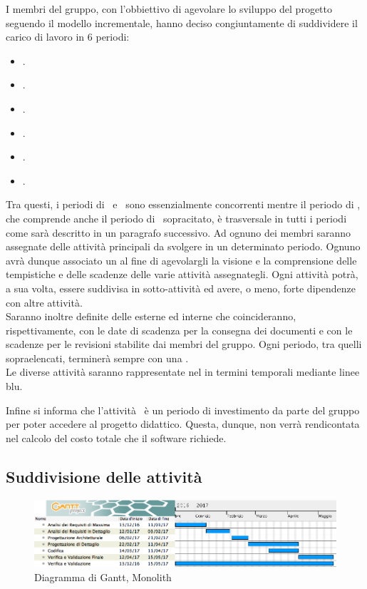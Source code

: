 I membri del gruppo, con l'obbiettivo di agevolare lo sviluppo del progetto seguendo il modello incrementale, hanno deciso congiuntamente di suddividere il carico di lavoro in 6 periodi:
\begin{itemize}
	\item \ARM.
	\item \ARD.
	\item \PA.
	\item \PD.
	\item \COD.
	\item \VV.
\end{itemize}
Tra questi, i periodi di \PD\ e \COD\ sono essenzialmente concorrenti mentre il periodo di , che comprende anche il periodo di \VV\ sopracitato, è trasversale in tutti i periodi come sarà descritto in un paragrafo successivo.
Ad ognuno dei membri saranno assegnate delle attività principali da svolgere in un determinato periodo. Ognuno avrà dunque associato un  al fine di agevolargli la visione e la comprensione delle tempistiche e delle scadenze delle varie attività assegnategli.
Ogni attività potrà, a sua volta, essere suddivisa in sotto-attività ed avere, o meno, forte dipendenze con altre attività.\\
Saranno inoltre definite delle  esterne ed interne che coincideranno, rispettivamente, con le date di scadenza per la consegna dei documenti e con le scadenze per le revisioni stabilite dai membri del gruppo.
Ogni periodo, tra quelli sopraelencati, terminerà sempre con una .\\

Le diverse attività saranno rappresentate nel  in termini temporali mediante linee blu.

Infine si informa che l'attività \ARM\ è un periodo di investimento da parte del gruppo per poter accedere al progetto didattico. Questa, dunque, non verrà rendicontata nel calcolo del costo totale che il software richiede.

\subsection{Suddivisione delle attività}

 \begin{figure}[H]
	\centering 
	\includegraphics[scale=0.5]{Immagini/Gantt/TOT.png}
	\caption{Diagramma di Gantt, Monolith}
\end{figure}

